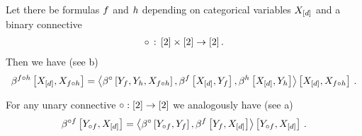 Let there be formulas $f$ and $h$ depending on categorical variables $X_{[d]}$ and a binary connective
\begin{align*}
    \circ \,:\, [2]\times[2] \rightarrow[2] \, .
\end{align*}
Then we have (see b)
\begin{align*}
    \beta^{f\circ h}\left[X_{[d]},X_{f\circ h}\right]
    = \left\langle 
        \beta^{\circ}\left[Y_{f},Y_{h},X_{f\circ h}\right],
        \beta^{f}\left[X_{[d]},Y_{f}\right],
        \beta^{h}\left[X_{[d]},Y_{h}\right]
    \right\rangle \left[ 
        X_{[d]},X_{f\circ h}
     \right] \, .
\end{align*}


For any unary connective $\circ: [2] \rightarrow[2]$ we analogously have (see a)
\begin{align*}
    \beta^{\circ f}\left[Y_{\circ f},X_{[d]}\right]
    = \left\langle 
        \beta^{\circ}\left[Y_{\circ f},Y_{f}\right],
        \beta^{f}\left[Y_{f},X_{[d]}\right]
    \right\rangle \left[ Y_{\circ f},X_{[d]} \right] \, .
\end{align*}

